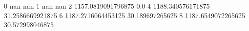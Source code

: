0 nan nan
1 nan nan
2 1157.0819091796875 0.0
4 1188.340576171875 31.2586669921875
6 1187.2716064453125 30.189697265625
8 1187.6549072265625 30.572998046875
